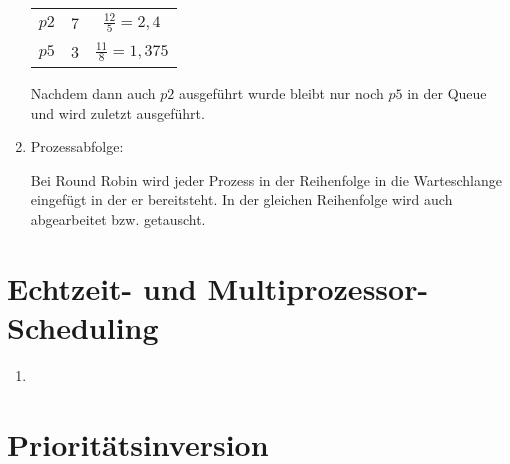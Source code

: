 \documentclass[a4paper,11pt,ngerman]{scrartcl}
\begin{document}
\begin{enumerate}[\bf a)]
\begin{tabular}{c|c|c}
            $p2$ & 7 & $\frac{12}{5} = 2,4$\\
            $p5$ & 3 & $\frac{11}{8} = 1,375$
        \end{tabular}

        Nachdem dann auch $p2$ ausgeführt wurde bleibt nur noch $p5$ in der
        Queue und wird zuletzt ausgeführt.

    \item Prozessabfolge:\\
        \begin{figure}[h]
            \scalebox{0.5}{}
        \end{figure}

        Bei Round Robin wird jeder Prozess in der Reihenfolge in die Warteschlange
        eingefügt in der er bereitsteht. In der gleichen Reihenfolge wird auch
        abgearbeitet bzw. getauscht.
\end{enumerate}

\section{Echtzeit- und Multiprozessor-Scheduling}

\begin{enumerate}[\bf a)]
    \item
\end{enumerate}

\section{Prioritätsinversion}
\end{document}
